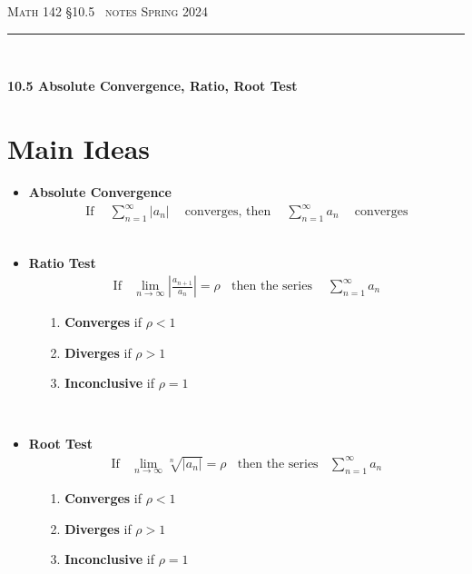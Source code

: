 \documentclass{article}
\def\chapt{10.5}
\begin{document}
\noindent
{\scshape Math 142} \hfill {\scshape \S\chapt~ notes} \hfill {\scshape Spring 2024}

\smallskip

\hrule

\bigskip

\hfill
\\

\thispagestyle{empty}

{
\huge
\noindent
\textbf{10.5 Absolute Convergence, Ratio, Root Test}
}

\section*{Main Ideas}

\begin{itemize}
\item
\textbf{Absolute Convergence}
\begin{gather*}
\text{If }
~~~~\sum_{n=1}^{\infty~} |a_n|
~~~~\text{ converges, then }~~~~
\sum_{n=1}^{\infty} a_n
~~~~\text{ converges}
\end{gather*}
\\

\item
\textbf{Ratio Test}
\begin{gather*}
\text{If}~~~~
\lim_{n \to \infty} \left| \frac{a_{n+1}}{a_n} \right| = \rho
~~~~\text{then the series }~~~~
\sum_{n=1}^{\infty} a_n
\end{gather*}
\begin{enumerate}
\item[1.]
\textbf{Converges} if $\rho<1$
\item[2.]
\textbf{Diverges} if $\rho>1$
\item[3.]
\textbf{Inconclusive} if $\rho=1$
\end{enumerate}
\hfill
\\

\item
\textbf{Root Test}
\begin{gather*}
\text{If}~~~~
\lim_{n\to \infty} \sqrt[n]{|a_n|} = \rho
~~~~\text{then the series}~~~~
\sum_{n=1}^{\infty} a_n
\end{gather*}
\begin{enumerate}
\item[1.]
\textbf{Converges} if $\rho<1$
\item[2.]
\textbf{Diverges} if $\rho>1$
\item[3.]
\textbf{Inconclusive} if $\rho=1$
\end{enumerate}
\hfill
\\

\end{itemize}
\end{document}
